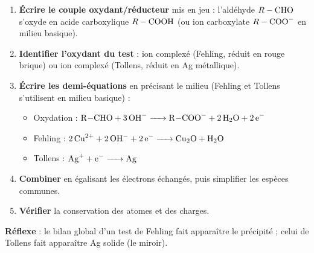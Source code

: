 \documentclass[11pt]{article}
\begin{document}
\begin{methode}
\begin{enumerate}
\item \textbf{Écrire le couple oxydant/réducteur} mis en jeu : l'aldéhyde $R-\ce{CHO}$ s'oxyde en acide carboxylique $R-\ce{COOH}$ (ou ion carboxylate $R-\ce{COO-}$ en milieu basique).
\item \textbf{Identifier l'oxydant du test} : ion  complexé (Fehling, réduit en  rouge brique) ou ion  complexé (Tollens, réduit en Ag métallique).
\item \textbf{Écrire les demi-équations} en précisant le milieu (Fehling et Tollens s'utilisent en milieu basique) :
\begin{itemize}
\item Oxydation : $\ce{R-CHO + 3OH- -> R-COO- + 2H2O + 2e-}$
\item Fehling : $\ce{2Cu^2+ + 2OH- + 2e- -> Cu2O + H2O}$
\item Tollens : $\ce{Ag+ + e- -> Ag}$
\end{itemize}
\item \textbf{Combiner} en égalisant les électrons échangés, puis simplifier les espèces communes.
\item \textbf{Vérifier} la conservation des atomes et des charges.
\end{enumerate}
\textbf{Réflexe} : le bilan global d'un test de Fehling fait apparaître le précipité  ; celui de Tollens fait apparaître Ag solide (le miroir).
\end{methode}
\end{document}
